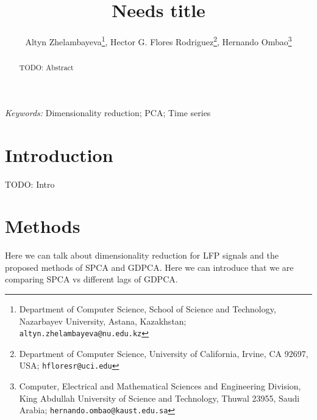 \documentclass[12pt]{article}
\begin{document}
\date{}
\def\spacingset#1{\renewcommand{\baselinestretch}%
{#1}\small\normalsize} \spacingset{1}


\title{\bf Needs title}
\author{Altyn Zhelambayeva\footnote{Department of Computer Science, School of Science and Technology, Nazarbayev University, Astana, Kazakhstan; \texttt{altyn.zhelambayeva@nu.edu.kz}}, Hector G. Flores Rodriguez\footnote{Department of Computer Science, University of California, Irvine, CA 92697, USA; \texttt{hfloresr@uci.edu}}, Hernando Ombao\footnote{Computer, Electrical and Mathematical Sciences and Engineering Division, King Abdullah University of Science and Technology, Thuwal 23955, Saudi Arabia; \texttt{hernando.ombao@kaust.edu.sa}}}
\maketitle


\bigskip
\begin{abstract}
TODO: Abstract
\end{abstract}

\noindent%
{\it Keywords:} Dimensionality reduction; PCA; Time series
\vfill


\newpage
\spacingset{2} %
\section{Introduction} \label{sec:intro}
TODO: Intro


\section{Methods} \label{sec:methods}
Here we can talk about dimensionality reduction for LFP signals and the proposed methods of SPCA and GDPCA. Here we can introduce that we are comparing SPCA vs different lags of GDPCA.
\end{document}
